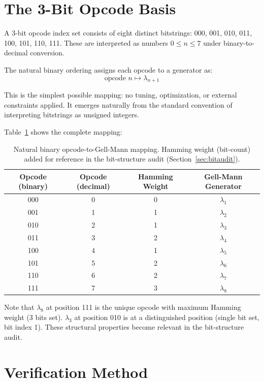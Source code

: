 \documentclass[11pt,a4paper]{article}
\begin{document}
\section{The 3-Bit Opcode Basis}

A 3-bit opcode index set consists of eight distinct bitstrings: 000, 001, 010, 011, 100, 101, 110, 111. These are interpreted as numbers $0 \leq n \leq 7$ under binary-to-decimal conversion.

The natural binary ordering assigns each opcode to a generator as:
\begin{equation}
\text{opcode } n \mapsto \lambda_{n+1}
\end{equation}

This is the simplest possible mapping: no tuning, optimization, or external constraints applied. It emerges naturally from the standard convention of interpreting bitstrings as unsigned integers.

Table~\ref{tbl:mapping} shows the complete mapping:

\begin{table}[h]
\centering
\begin{tabular}{|c|c|c|c|}
\hline
Opcode (binary) & Opcode (decimal) & Hamming Weight & Gell-Mann Generator \\
\hline
000 & 0 & 0 & $\lambda_1$ \\
001 & 1 & 1 & $\lambda_2$ \\
010 & 2 & 1 & $\lambda_3$ \\
011 & 3 & 2 & $\lambda_4$ \\
100 & 4 & 1 & $\lambda_5$ \\
101 & 5 & 2 & $\lambda_6$ \\
110 & 6 & 2 & $\lambda_7$ \\
111 & 7 & 3 & $\lambda_8$ \\
\hline
\end{tabular}
\caption{Natural binary opcode-to-Gell-Mann mapping. Hamming weight (bit-count) added for reference in the bit-structure audit (Section~\ref{sec:bitaudit}).}
\label{tbl:mapping}
\end{table}

Note that $\lambda_8$ at position 111 is the unique opcode with maximum Hamming weight (3 bits set). $\lambda_3$ at position 010 is at a distinguished position (single bit set, bit index 1). These structural properties become relevant in the bit-structure audit.

\section{Verification Method}
\end{document}
